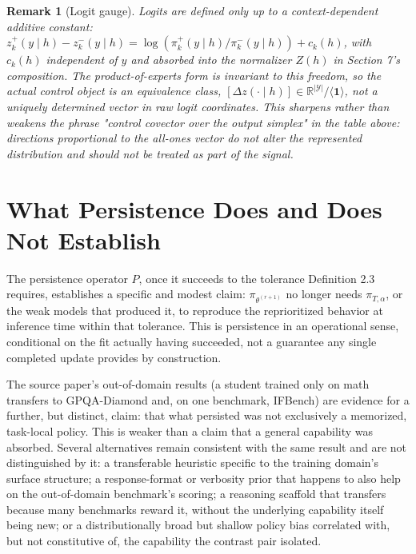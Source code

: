 \documentclass[11pt]{article}
\newtheorem{remark}[definition]{Remark}
\begin{document}
\begin{remark}[Logit gauge]
Logits are defined only up to a context-dependent additive constant: $z_k^{+}(y\mid h) - z_k^{-}(y\mid h) = \log(\pi_k^{+}(y\mid h)/\pi_k^{-}(y\mid h)) + c_k(h)$, with $c_k(h)$ independent of $y$ and absorbed into the normalizer $Z(h)$ in Section 7's composition. The product-of-experts form is invariant to this freedom, so the actual control object is an equivalence class, $[\Delta z(\cdot \mid h)] \in \mathbb{R}^{|\mathcal{Y}|}/\langle \mathbf{1}\rangle$, not a uniquely determined vector in raw logit coordinates. This sharpens rather than weakens the phrase "control covector over the output simplex" in the table above: directions proportional to the all-ones vector do not alter the represented distribution and should not be treated as part of the signal.
\end{remark}

\section{What Persistence Does and Does Not Establish}

The persistence operator $P$, once it succeeds to the tolerance Definition 2.3 requires, establishes a specific and modest claim: $\pi_{\theta^{(r+1)}}$ no longer needs $\pi_{T,\alpha}$, or the weak models that produced it, to reproduce the reprioritized behavior at inference time within that tolerance. This is persistence in an operational sense, conditional on the fit actually having succeeded, not a guarantee any single completed update provides by construction.

The source paper's out-of-domain results (a student trained only on math transfers to GPQA-Diamond and, on one benchmark, IFBench) are evidence for a further, but distinct, claim: that what persisted was not exclusively a memorized, task-local policy. This is weaker than a claim that a general capability was absorbed. Several alternatives remain consistent with the same result and are not distinguished by it: a transferable heuristic specific to the training domain's surface structure; a response-format or verbosity prior that happens to also help on the out-of-domain benchmark's scoring; a reasoning scaffold that transfers because many benchmarks reward it, without the underlying capability itself being new; or a distributionally broad but shallow policy bias correlated with, but not constitutive of, the capability the contrast pair isolated.
\end{document}
